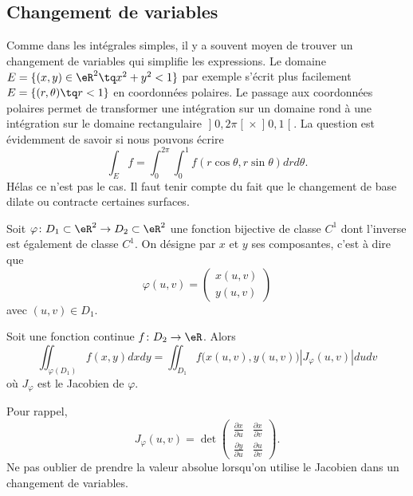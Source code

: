 \subsection{Changement de variables}

Comme dans les intégrales simples, il y a souvent moyen de trouver un changement de variables qui simplifie les expressions.  Le domaine $E=\{ (x,y)\in\eR^2\tq x^2+y^2<1 \}$ par exemple s'écrit plus facilement $E=\{ (r,\theta)\tq r<1 \}$ en coordonnées polaires. Le passage aux coordonnées polaires permet de transformer une intégration sur un domaine rond à une intégration sur le domaine rectangulaire $\mathopen]0,2\pi\mathclose[\times\mathopen]0,1\mathclose[$. La question est évidemment de savoir si nous pouvons écrire
\begin{equation}
	\int_Ef=\int_{0}^{2\pi}\int_0^1f(r\cos\theta,r\sin\theta)drd\theta.
\end{equation}
Hélas ce n'est pas le cas. Il faut tenir compte du fait que le changement de base dilate ou contracte certaines surfaces.

Soit $\varphi\colon D_1\subset\eR^2\to D_2\subset \eR^2$ une fonction bijective de classe $C^1$ dont l'inverse est également de classe $C^1$. On désigne par $x$ et $y$ ses composantes, c'est à dire que
\begin{equation}
    \varphi(u,v)=\begin{pmatrix}
        x(u,v)    \\
        y(u,v)
    \end{pmatrix}
\end{equation}
avec $(u,v)\in D_1$.

\begin{theorem}     \label{ThoChamDeVarIntDDf}
    Soit une fonction continue $f\colon D_2\to \eR$. Alors
    \begin{equation}
        \iint_{\varphi(D_1)}f(x,y)dxdy=\iint_{D_1}f\big( x(u,v),y(u,v) \big)| J_{\varphi}(u,v) |dudv
    \end{equation}
    où $J_{\varphi}$ est le Jacobien de $\varphi$.
\end{theorem}
Pour rappel,
\begin{equation}
    J_{\varphi}(u,v)=\det\begin{pmatrix}
        \frac{ \partial x }{ \partial u }    &   \frac{ \partial x }{ \partial v }    \\
        \frac{ \partial y }{ \partial u }    &   \frac{ \partial u }{ \partial v }
    \end{pmatrix}.
\end{equation}
Ne pas oublier de prendre la valeur absolue lorsqu'on utilise le Jacobien dans un changement de variables.

